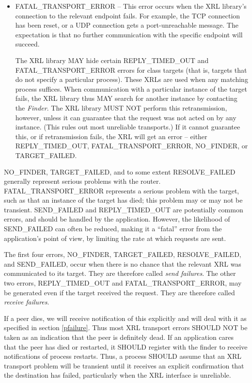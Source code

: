 \documentclass[11pt]{article}
\makeatletter
\newcommand{\finder} {{\em Finder}\@\xspace}
\makeatother
\begin{document}
\begin{itemize}
\item FATAL\_TRANSPORT\_ERROR -- This error occurs when the XRL library's
connection to the relevant endpoint fails. For example, the TCP connection
has been reset, or a UDP connection gets a port-unreachable message. The
expectation is that no further communication with the specific endpoint
will succeed.

The XRL library MAY hide certain REPLY\_TIMED\_OUT and
FATAL\_TRANSPORT\_ERROR errors for class targets (that is, targets that do
not specify a particular process). These XRLs are used when any matching
process suffices. When communication with a particular instance of the
target fails, the XRL library thus MAY search for another instance by
contacting the \finder. The XRL library MUST NOT perform this
retransmission, however, unless it can guarantee that the request was not
acted on by any instance. (This rules out most unreliable transports.) If
it cannot guarantee this, or if retransmission fails, the XRL will get an
error -- either REPLY\_TIMED\_OUT, FATAL\_TRANSPORT\_ERROR, NO\_FINDER, or
TARGET\_FAILED.

\end{itemize}

NO\_FINDER, TARGET\_FAILED, and to some extent RESOLVE\_FAILED generally
represent serious problems with the router. FATAL\_TRANSPORT\_ERROR
represents a serious problem with the target, such as that an instance of
the target has died; this problem may or may not be transient. SEND\_FAILED
and REPLY\_TIMED\_OUT are potentially common errors, and should be handled
by the application. However, the likelihood of SEND\_FAILED can often be
reduced, making it a ``fatal'' error from the application's point of view,
by limiting the rate at which requests are sent.

The first four errors, NO\_FINDER, TARGET\_FAILED, RESOLVE\_FAILED, and
SEND\_FAILED, occur when there is no chance that the relevant XRL was
communicated to its target. They are therefore called \emph{send failures}.
The other two errors, REPLY\_TIMED\_OUT and FATAL\_TRANSPORT\_ERROR, may be
generated even if the target received the request. They are therefore
called \emph{receive failures}.

If a peer dies, we will receive notification of this explicitly and will
deal with it as specified in section \ref{pfailure}. Thus most XRL
transport errors SHOULD NOT be taken as an indication that the peer is
definitely dead. If an application cares that the peer has died or
restarted, it SHOULD register with the finder to receive notifications of
process restarts. Thus, a process SHOULD assume that an XRL transport
problem will be transient until it receives an explicit confirmation that
the destination has failed, particularly when the XRL interface is
unreliable.
\end{document}
